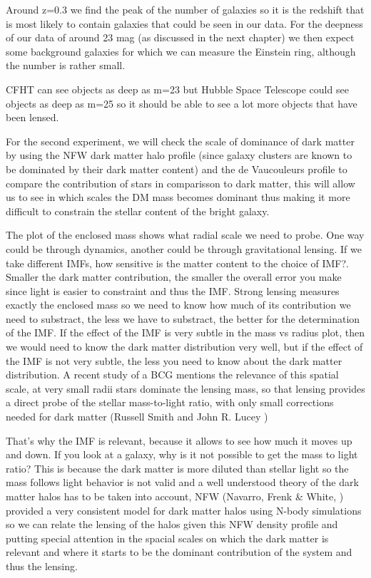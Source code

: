 Around z=0.3 we find the peak of the number of galaxies so it is the redshift that is most likely to contain galaxies that could be seen in our data. For the deepness of our data of around 23 mag (as discussed in the next chapter) we then expect some background galaxies for which we can measure the Einstein ring, although the number is rather small. 

CFHT can see objects as deep as m=23 but Hubble Space Telescope could see objects as deep as m=25 so it should be able to see a lot more objects that have been lensed.

For the second experiment, we will check the scale of dominance of dark matter by using the NFW dark matter halo profile (since galaxy clusters are known to be dominated by their dark matter content) and the de Vaucouleurs profile to compare the contribution of stars in comparisson to dark matter, this will allow us to see in which scales the DM mass becomes dominant thus making it more difficult to constrain the stellar content of the bright galaxy.

The plot of the enclosed mass shows what radial scale we need to probe. One way could be through dynamics, another could be through gravitational lensing. If we take different IMFs, how sensitive is the matter content to the choice of IMF?. Smaller the dark matter contribution, the smaller the overall error you make since light is easier to constraint and thus the IMF. Strong lensing measures exactly the enclosed mass so we need to know how much of its contribution we need to substract, the less we have to substract, the better for the determination of the IMF. If the effect of the IMF is very subtle in the mass vs radius plot, then we would need to know the dark matter distribution very well, but if the effect of the IMF is not very subtle, the less you need to know about the dark matter distribution. A recent study of a BCG mentions the relevance of this spatial scale, at very small radii stars dominate the lensing mass, so that lensing provides a direct probe of the stellar mass-to-light ratio, with only small corrections needed for dark matter (Russell Smith and John R. Lucey \citeyear{Reference7}) 

That's why the IMF is relevant, because it allows to see how much it moves up and down. If you look at a galaxy, why is it not possible to get the mass to light ratio? This is because the dark matter is more diluted than stellar light so the mass follows light behavior is not valid and a well understood theory of the dark matter halos has to be taken into account, NFW (Navarro, Frenk \& White, \citeyear{Reference17}) provided a very consistent model for dark matter halos using N-body simulations so we can relate the lensing of the halos given this NFW density profile and putting special attention in the spacial scales on which the dark matter is relevant and where it starts to be the dominant contribution of the system and thus the lensing.


